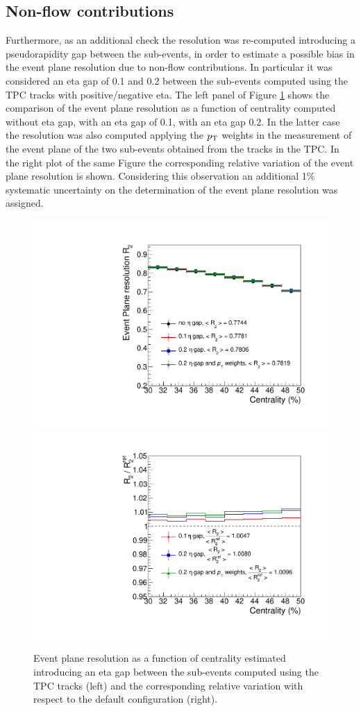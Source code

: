 \subsection{Non-flow contributions}
\label{sec:NonFlow}
Furthermore, as an additional check the resolution 
was re-computed introducing 
a pseudorapidity gap between the sub-events, 
in order to estimate a possible bias 
in the event plane resolution due to non-flow contributions. 
In particular it was considered an eta 
gap of 0.1 and 0.2 between the sub-events computed using
 the TPC tracks with positive/negative 
eta. The left panel of Figure \ref{fig:EtaGapSyst} shows
 the comparison of the event plane resolution
as a function of centrality computed without eta gap, 
with an eta gap of 0.1, with an eta gap 0.2. 
In the latter case the resolution was also computed 
applying the $p_{\rm T}$ weights in the measurement of
the event plane of the two sub-events obtained from the tracks in the TPC.
In the right plot of the same Figure the corresponding 
relative variation of the event plane resolution is shown.
Considering this observation an additional 1\%
 systematic uncertainty on the determination of the
event plane resolution was assigned.

\begin{figure}
\centering
  \includegraphics[width=.45\textwidth]{FigCap5/EPresolution_VZERO_NonFlowSyst.pdf}
  \includegraphics[width=.45\textwidth]{FigCap5/EPresolution_VZERO_NonFlowSyst_ratio.pdf}
\caption{Event plane resolution as a function of centrality estimated introducing an eta gap between the sub-events computed using the TPC tracks (left) and the corresponding relative variation with respect to the default configuration (right).}
\label{fig:EtaGapSyst}
\end{figure}

